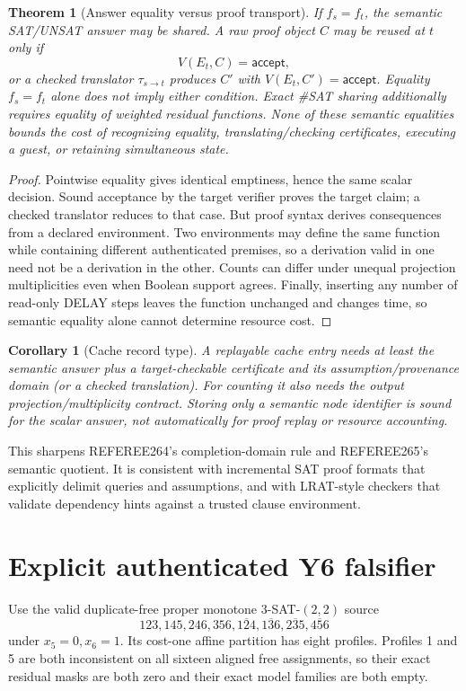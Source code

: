 \documentclass[11pt]{article}
\newtheorem{theorem}{Theorem}
\newtheorem{corollary}{Corollary}
\begin{document}
\begin{theorem}[Answer equality versus proof transport]
If $f_s=f_t$, the semantic SAT/UNSAT answer may be shared.  A raw proof object $C$ may be reused at $t$ only if
\[
  V(E_t,C)=\mathsf{accept},
\]
or a checked translator $\tau_{s\to t}$ produces $C'$ with $V(E_t,C')=\mathsf{accept}$.  Equality $f_s=f_t$ alone does not imply either condition.  Exact \#SAT sharing additionally requires equality of weighted residual functions.  None of these semantic equalities bounds the cost of recognizing equality, translating/checking certificates, executing a guest, or retaining simultaneous state.
\end{theorem}
\begin{proof}
Pointwise equality gives identical emptiness, hence the same scalar decision.  Sound acceptance by the target verifier proves the target claim; a checked translator reduces to that case.  But proof syntax derives consequences from a declared environment.  Two environments may define the same function while containing different authenticated premises, so a derivation valid in one need not be a derivation in the other.  Counts can differ under unequal projection multiplicities even when Boolean support agrees.  Finally, inserting any number of read-only DELAY steps leaves the function unchanged and changes time, so semantic equality alone cannot determine resource cost.
\end{proof}

\begin{corollary}[Cache record type]
A replayable cache entry needs at least the semantic answer plus a target-checkable certificate and its assumption/provenance domain (or a checked translation).  For counting it also needs the output projection/multiplicity contract.  Storing only a semantic node identifier is sound for the scalar answer, not automatically for proof replay or resource accounting.
\end{corollary}

This sharpens REFEREE264's completion-domain rule and REFEREE265's semantic quotient.  It is consistent with incremental SAT proof formats that explicitly delimit queries and assumptions, and with LRAT-style checkers that validate dependency hints against a trusted clause environment.

\section{Explicit authenticated Y6 falsifier}
Use the valid duplicate-free proper monotone 3-SAT-$(2,2)$ source
\[
123,145,246,356,\overline{124},\overline{136},\overline{235},\overline{456}
\]
under $x_5=0,x_6=1$.  Its cost-one affine partition has eight profiles.  Profiles 1 and 5 are both inconsistent on all sixteen aligned free assignments, so their exact residual masks are both zero and their exact model families are both empty.
\end{document}
